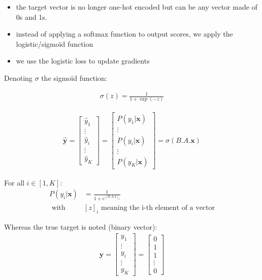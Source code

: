 \begin{itemize}
	\item the target vector is no longer one-hot encoded but can be any vector made of 0s and 1s.
	\item instead of applying a softmax function to output scores, we apply the logistic/sigmoïd function
	\item we use the logistic loss to update gradients
\end{itemize}


Denoting $\sigma$ the sigmoïd function:

\begin{align}
	\sigma(z) = \frac{1}{1 + \exp(-z)}
\end{align}

\begin{align}
 \mathbf{\hat y}
 	= \begin{bmatrix} 
		\hat y_1 \\
		\vdots \\
		\hat y_i\\
		\vdots \\
		\hat y_K
	\end{bmatrix}
	 = \begin{bmatrix} 
		P(y_1 | \mathbf{x}) \\
		\vdots \\
		P(y_i | \mathbf{x})\\
		\vdots \\
		P(y_K | \mathbf{x})
	\end{bmatrix} = 
	\sigma(B.A.\mathbf{x})
\end{align}

For all $i \in [1, K]$: 
\begin{align}
	P(y_i | \mathbf{x}) &= \frac{1}{1 + e^{[B.A.x]_i}}\\
		\text{      with } &[z]_i \text{ meaning the i-th element of a vector}
\end{align}

Whereas the true target is noted (binary vector):
\begin{align}
 \mathbf{y} = 
	\begin{bmatrix} 
		y_1 \\
		\vdots \\
		y_i \\
		\vdots \\
		y_K
	\end{bmatrix}
	= 
	\begin{bmatrix} 
		0 \\
		1 \\
		1 \\
		\vdots \\
		0
	\end{bmatrix}  
\end{align}

